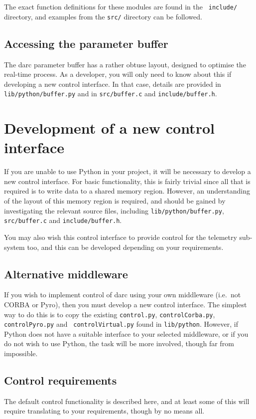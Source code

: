\documentclass[a4,10pt]{article}
\begin{document}
The exact function definitions for these modules are found in the {\tt
  include/} directory, and examples from the {\tt src/} directory can
be followed.

\subsection{Accessing the parameter buffer}
The darc parameter buffer has a rather obtuse layout, designed to
optimise the real-time process.  As a developer, you will only need to
know about this if developing a new control interface.  In that case,
details are provided in {\tt lib/python/buffer.py} and in {\tt src/buffer.c}
and {\tt include/buffer.h}.

\section{Development of a new control interface}
If you are unable to use Python in your project, it will be necessary
to develop a new control interface.  For basic functionality, this is
fairly trivial since all that is required is to write data to a shared
memory region.  However, an understanding of the layout of this memory
region is required, and should be gained by investigating the relevant
source files, including {\tt lib/python/buffer.py}, {\tt src/buffer.c}
and {\tt include/buffer.h}.

You may also wish this control interface to provide control for the
telemetry sub-system too, and this can be developed depending on your
requirements.

\subsection{Alternative middleware}
If you wish to implement control of darc using your own middleware
(i.e.\ not CORBA or Pyro), then you must develop a new control
interface.  The simplest way to do this is to copy the existing
{\tt control.py}, {\tt controlCorba.py}, {\tt controlPyro.py} and {\tt
  controlVirtual.py} found in {\tt lib/python}.  However, if Python
does not have a suitable interface to your selected middleware, or if
you do not wish to use Python, the task will be more involved, though
far from impossible.

\subsection{Control requirements}
The default control functionality is described here, and at least some
of this will require translating to your requirements, though by no
means all.
\end{document}
